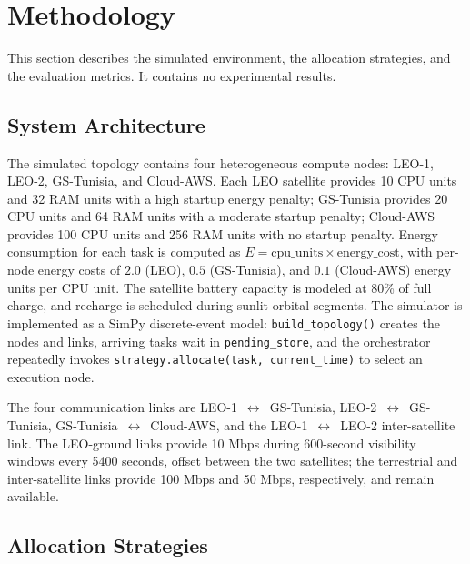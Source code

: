\documentclass[conference]{IEEEtran}
\begin{document}
\section{Methodology}
\label{sec:methodology}

This section describes the simulated environment, the allocation strategies, and the evaluation metrics. It contains no experimental results.

\subsection{System Architecture}
\label{sec:architecture}

The simulated topology contains four heterogeneous compute nodes: LEO-1, LEO-2, GS-Tunisia, and Cloud-AWS. Each LEO satellite provides 10 CPU units and 32 RAM units with a high startup energy penalty; GS-Tunisia provides 20 CPU units and 64 RAM units with a moderate startup penalty; Cloud-AWS provides 100 CPU units and 256 RAM units with no startup penalty. Energy consumption for each task is computed as $E = \text{cpu\_units} \times \text{energy\_cost}$, with per-node energy costs of $2.0$ (LEO), $0.5$ (GS-Tunisia), and $0.1$ (Cloud-AWS) energy units per CPU unit. The satellite battery capacity is modeled at 80\% of full charge, and recharge is scheduled during sunlit orbital segments. The simulator is implemented as a SimPy discrete-event model: \texttt{build\_topology()} creates the nodes and links, arriving tasks wait in \texttt{pending\_store}, and the orchestrator repeatedly invokes \texttt{strategy.allocate(task, current\_time)} to select an execution node.

The four communication links are LEO-1~$\leftrightarrow$~GS-Tunisia, LEO-2~$\leftrightarrow$~GS-Tunisia, GS-Tunisia~$\leftrightarrow$~Cloud-AWS, and the LEO-1~$\leftrightarrow$~LEO-2 inter-satellite link. The LEO-ground links provide 10 Mbps during 600-second visibility windows every 5400 seconds, offset between the two satellites; the terrestrial and inter-satellite links provide 100 Mbps and 50 Mbps, respectively, and remain available.

\subsection{Allocation Strategies}
\label{sec:strategies}
\end{document}
